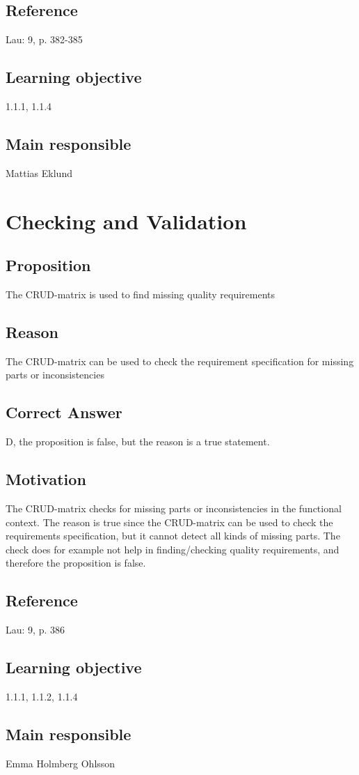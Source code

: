 \documentclass[a4paper]{article}
\begin{document}
\subsection*{Reference}
Lau: 9, p. 382-385
\subsection*{Learning objective}
1.1.1, 1.1.4
\subsection*{Main responsible}
Mattias Eklund

\section{Checking and Validation}
\subsection*{Proposition}
The CRUD-matrix is used to find missing quality requirements
\subsection*{Reason}
The CRUD-matrix can be used to check the requirement specification for missing parts or inconsistencies 
\subsection*{Correct Answer}
D, the proposition is false, but the reason is a true statement.
\subsection*{Motivation}
The CRUD-matrix checks for missing parts or inconsistencies in the functional context. The reason is true since the CRUD-matrix can be used to check the requirements specification, but it cannot detect all kinds of missing parts. The check does for example not help in finding/checking quality requirements, and therefore the proposition is false.
\subsection*{Reference}
Lau: 9, p. 386
\subsection*{Learning objective}
1.1.1, 1.1.2, 1.1.4
\subsection*{Main responsible}
Emma Holmberg Ohlsson
\end{document}
